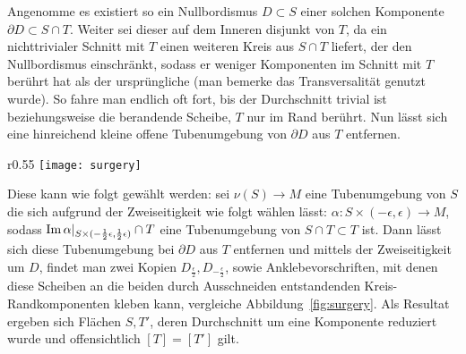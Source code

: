   
            Angenomme es existiert so ein Nullbordismus $D\subset S$ einer solchen Komponente $\partial D \subset S \cap T$. Weiter sei dieser auf dem Inneren disjunkt von $T$, da ein nichttrivialer Schnitt mit $T$ einen weiteren Kreis aus $S\cap T$ liefert, der den Nullbordismus einschränkt, sodass er weniger Komponenten im Schnitt mit $T$ berührt hat als der ursprüngliche (man bemerke das Transversalität genutzt wurde). So fahre man endlich oft fort, bis der Durchschnitt trivial ist beziehungsweise die berandende Scheibe, $T$ nur im Rand berührt.
            Nun lässt sich eine hinreichend kleine offene Tubenumgebung von $\partial D$ aus $T$ entfernen.
                     \begin{wrapfigure}{r}{0.55\textwidth}
                \centering
                \texttt{[image: surgery]}
                \caption{Ausschneiden einer Umgebung von $S\cap T$ und Ankleben zweier Scheiben, sodass die Homologieklasse erhalten bleibt}
                \label{fig:surgery}
            \end{wrapfigure} Diese kann wie folgt gewählt werden: sei $\nu(S) \to M$ eine Tubenumgebung von $S$ die sich aufgrund der Zweiseitigkeit wie folgt wählen lässt: $\alpha: S \times (-\epsilon,\epsilon) \to M$, sodass $\operatorname{Im}\alpha|_{S\times (-\frac 12\epsilon,\frac 12 \epsilon)} \cap T$ eine Tubenumgebung von $S\cap T \subset T$ ist. Dann lässt sich diese Tubenumgebung bei $\partial D$ aus $T$ entfernen und mittels der Zweiseitigkeit um $D$, findet man zwei Kopien $D_{\frac \epsilon 2}, D_{-\frac \epsilon 2}$, sowie Anklebevorschriften, mit denen diese Scheiben an die beiden durch Ausschneiden entstandenden Kreis-Randkomponenten kleben kann, vergleiche Abbildung~\ref{fig:surgery}. Als Resultat ergeben sich Flächen $S,T'$, deren Durchschnitt um eine Komponente reduziert wurde und offensichtlich $[T]=[T']$ gilt. 

